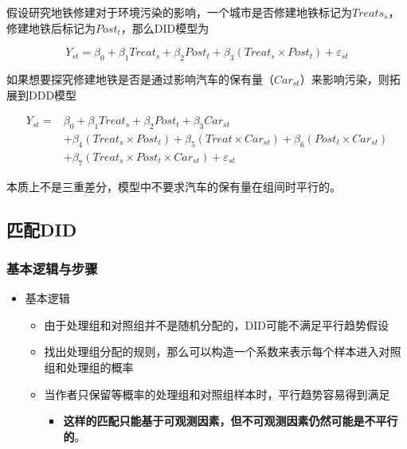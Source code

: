 \documentclass[11pt,a4paper]{ctexart}
\newcommand{\ba}{\begin{aligned}}
\newcommand{\ea}{\end{aligned}}
\newcommand{\ve}{\varepsilon}
\begin{document}
假设研究地铁修建对于环境污染的影响，一个城市是否修建地铁标记为\(Treats_s\)，修建地铁后标记为\(Post_t\)，那么DID模型为

\[Y_{st}=\beta_0+\beta_1 Treat_s+\beta_2 Post_t+\beta_3(Treat_s\times Post_t)+\ve_{st}\]

如果想要探究修建地铁是否是通过影响汽车的保有量（\(Car_{st}\)）来影响污染，则拓展到DDD模型

\[\ba
Y_{st}=& \beta_0+\beta_1 Treat_s+\beta_2 Post_t+\beta_3 Car_{st}\\
&+\beta_4(Treat_s\times Post_t)+\beta_5(Treat\times Car_{st})+\beta_6(Post_t\times Car_{st})
\\
& +\beta_7(Treat_s\times Post_t\times Car_{st})+\ve_{st}
\ea\]

本质上不是三重差分，模型中不要求汽车的保有量在组间时平行的。

\subsection{匹配DID}

\subsubsection{基本逻辑与步骤}

\begin{itemize}
\item
  基本逻辑

  \begin{itemize}
  \item
    由于处理组和对照组并不是随机分配的，DID可能不满足平行趋势假设
  \end{itemize}

  \begin{itemize}
  \item
    找出处理组分配的规则，那么可以构造一个系数来表示每个样本进入对照组和处理组的概率
  \end{itemize}

  \begin{itemize}
  \item
    当作者只保留等概率的处理组和对照组样本时，平行趋势容易得到满足

    \begin{itemize}
    \item
      \textbf{这样的匹配只能基于可观测因素，但不可观测因素仍然可能是不平行的}。
    \end{itemize}
  \end{itemize}
\end{itemize}
\end{document}

